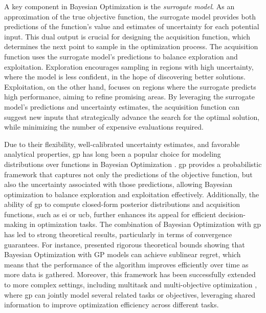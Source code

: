 A key component in Bayesian Optimization is the \textit{surrogate model}. As an approximation of the true objective function, the surrogate model provides both predictions of the function's value and estimates of uncertainty for each potential input. This dual output is crucial for designing the acquisition function, which determines the next point to sample in the optimization process. The acquisition function uses the surrogate model's predictions to balance exploration and exploitation. Exploration encourages sampling in regions with high uncertainty, where the model is less confident, in the hope of discovering better solutions. Exploitation, on the other hand, focuses on regions where the surrogate predicts high performance, aiming to refine promising areas. By leveraging the surrogate model's predictions and uncertainty estimates, the acquisition function can suggest new inputs that strategically advance the search for the optimal solution, while minimizing the number of expensive evaluations required.

Due to their flexibility, well-calibrated uncertainty estimates, and favorable analytical properties, \ac{gp} has long been a popular choice for modeling distributions over functions in Bayesian Optimization \citep{osborne2009gaussian}. \ac{gp} provides a probabilistic framework that captures not only the predictions of the objective function, but also the uncertainty associated with those predictions, allowing Bayesian optimization to balance exploration and exploitation effectively. Additionally, the ability of \ac{gp} to compute closed-form posterior distributions and acquisition functions, such as \ac{ei} or \ac{ucb}, further enhances its appeal for efficient decision-making in optimization tasks. The combination of Bayesian Optimization with \ac{gp} has led to strong theoretical results, particularly in terms of convergence guarantees. For instance, \citet{srinivas2009gaussian} presented rigorous theoretical bounds showing that Bayesian Optimization with GP models can achieve sublinear regret, which means that the performance of the algorithm improves efficiently over time as more data is gathered. Moreover, this framework has been successfully extended to more complex settings, including multitask and multi-objective optimization \citep{swersky2013multi}, where \ac{gp} can jointly model several related tasks or objectives, leveraging shared information to improve optimization efficiency across different tasks.


